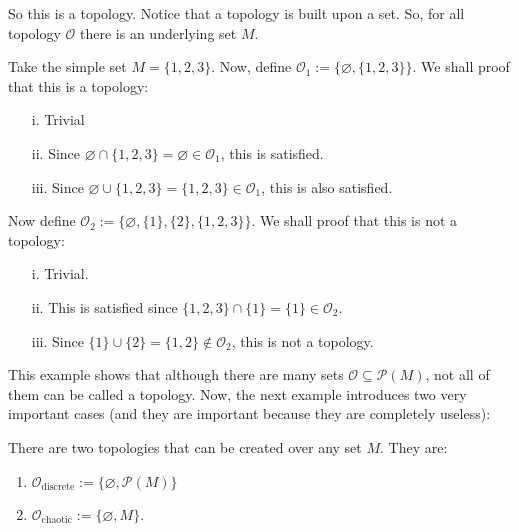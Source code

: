\noindent
So this is a topology. Notice that a topology is built upon a set. So, for all topology $\mathcal{O}$ there is an underlying set $M$.

\begin{example}
Take the simple set $M = \{ 1,2,3 \}$. Now, define $\mathcal{O}_1 := \{ \varnothing, \{1,2,3\} \}$. We shall proof that this is a topology:
\begin{itemize}
    \item[i.] Trivial
    \item[ii.] Since $\varnothing \cap \{1,2,3\} = \varnothing \in \mathcal{O}_1$, this is satisfied.
    \item[iii.] Since $\varnothing \cup \{1,2,3\} = \{1,2,3\} \in \mathcal{O}_1$, this is also satisfied.
\end{itemize}

Now define $\mathcal{O}_2 := \{ \varnothing, \{1\}, \{2\}, \{1,2,3\} \}$. We shall proof that this is not a topology:
\begin{itemize}
    \item[i.] Trivial.
    \item[ii.] This is satisfied since $\{1,2,3\} \cap \{1\} = \{1\} \in \mathcal{O}_2$.
    \item[iii.] Since $\{1\} \cup \{2\} = \{1,2\} \notin \mathcal{O}_2$, this is not a topology.
\end{itemize}
\qedwhite
\end{example}

This example shows that although there are many sets $\mathcal{O} \subseteq \mathcal{P}(M)$, not all of them can be called a topology. Now, the next example introduces two very important cases (and they are important because they are completely useless):

\begin{example}
There are two topologies that can be created over any set $M$. They are:
\begin{enumerate}
    \item $\mathcal{O}_{\text{discrete}} := \{\varnothing, \mathcal{P}(M) \}$
    \item $\mathcal{O}_{\text{chaotic}} := \{\varnothing, M \}$.
\end{enumerate}
    \qedwhite
\end{example}

